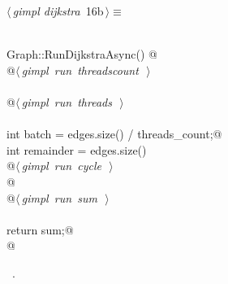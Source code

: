 \documentclass[12pt]{article}
\begin{document}
\begin{flushleft} \small
\begin{minipage}{\linewidth}\label{scrap26}\raggedright\small
{} $\langle\,${\itshape gimpl dijkstra}\nobreak\ {\footnotesize {16b}}$\,\rangle\equiv$
\vspace{-1ex}
\begin{list}{}{} \item
\mbox{}\verb@@\\
\mbox{}\verb@double Graph::RunDijkstraAsync() {@\\
\mbox{}\verb@    @\hbox{$\langle\,${\itshape gimpl run threadscount}\nobreak\ {\footnotesize {}}$\,\rangle$}\verb@@\\
\mbox{}\verb@@\\
\mbox{}\verb@    @\hbox{$\langle\,${\itshape gimpl run threads}\nobreak\ {\footnotesize {}}$\,\rangle$}\verb@@\\
\mbox{}\verb@@\\
\mbox{}\verb@    int batch = edges.size() / threads_count;@\\
\mbox{}\verb@    int remainder = edges.size() % threads_count;@\\
\mbox{}\verb@@\\
\mbox{}\verb@    @\hbox{$\langle\,${\itshape gimpl run cycle}\nobreak\ {\footnotesize {}}$\,\rangle$}\verb@@\\
\mbox{}\verb@    @\\
\mbox{}\verb@    @\hbox{$\langle\,${\itshape gimpl run sum}\nobreak\ {\footnotesize {}}$\,\rangle$}\verb@@\\
\mbox{}\verb@@\\
\mbox{}\verb@    return sum;@\\
\mbox{}\verb@} @\\
\mbox{}\verb@@{\NWsep}
\end{list}
\vspace{-1.5ex}
\footnotesize
\begin{list}{}{\setlength{\itemsep}{-\parsep}\setlength{\itemindent}{-\leftmargin}}
\item \NWtxtMacroRefIn\ .

\item{}
\end{list}
\end{minipage}\vspace{4ex}
\end{flushleft}
\end{document}
